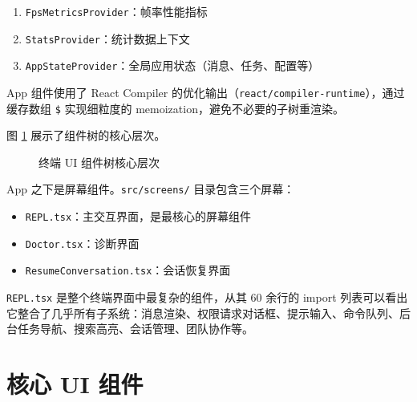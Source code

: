 \begin{enumerate}
  \item \texttt{FpsMetricsProvider}：帧率性能指标
  \item \texttt{StatsProvider}：统计数据上下文
  \item \texttt{AppStateProvider}：全局应用状态（消息、任务、配置等）
\end{enumerate}

App 组件使用了 React Compiler 的优化输出（\texttt{react/compiler-runtime}），通过缓存数组 \texttt{\$} 实现细粒度的 memoization，避免不必要的子树重渲染。

图 \ref{fig:component-tree} 展示了组件树的核心层次。

\begin{figure}[htbp]
\centering
{}
\caption{终端 UI 组件树核心层次}
\label{fig:component-tree}
\end{figure}

App 之下是屏幕组件。\texttt{src/screens/} 目录包含三个屏幕：

\begin{itemize}
  \item \texttt{REPL.tsx}：主交互界面，是最核心的屏幕组件
  \item \texttt{Doctor.tsx}：诊断界面
  \item \texttt{ResumeConversation.tsx}：会话恢复界面
\end{itemize}

\texttt{REPL.tsx} 是整个终端界面中最复杂的组件，从其 60 余行的 import 列表可以看出它整合了几乎所有子系统：消息渲染、权限请求对话框、提示输入、命令队列、后台任务导航、搜索高亮、会话管理、团队协作等。

\section{核心 UI 组件}


